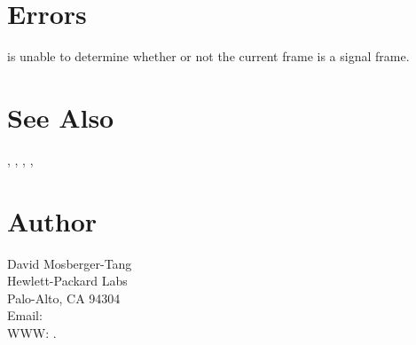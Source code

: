 \documentclass{article}
\begin{document}
\section{Errors}

\begin{Description}
\item[\Const{UNW\_ENOINFO}]  is unable to determine
  whether or not the current frame is a signal frame.
\end{Description}

\section{See Also}

,
,
,
,

\section{Author}

\noindent
David Mosberger-Tang\\
Hewlett-Packard Labs\\
Palo-Alto, CA 94304\\
Email: \\
WWW: .
\LatexManEnd
\end{document}
